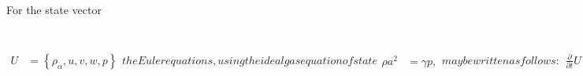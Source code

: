 For the state vector
\begin{subequations}
\label{eq:eulerprim}
\begin{align}
  U &= \left\{ \rho_\alpha, u, v, w, p \right\}
\end{align}
the Euler equations, using the ideal gas equation of state
\begin{align}
  \rho a^2 &= \gamma p,
\end{align}
may be written as follows:
\begin{align}
    \frac{\partial}{\partial{}t}U
+ A \frac{\partial}{\partial{}x}U
+ B \frac{\partial}{\partial{}y}U
+ C \frac{\partial}{\partial{}z}U
&= 0
\end{align}
\begin{align}
 A &= \begin{bmatrix}
        u & \rho_\alpha & 0 & 0 & 0              \\
        0 & u           & 0 & 0 & \frac{1}{\rho} \\
        0 & 0           & u & 0 & 0              \\
        0 & 0           & 0 & u & 0              \\
        0 & \gamma p    & 0 & 0 & u              \\
       \end{bmatrix}
&
 B &= \begin{bmatrix}
        v & 0 & \rho_\alpha & 0 & 0              \\
        0 & v & 0           & 0 & 0              \\
        0 & 0 & v           & 0 & \frac{1}{\rho} \\
        0 & 0 & 0           & v & 0              \\
        0 & 0 & \gamma p    & 0 & v              \\
       \end{bmatrix}
&
 C &= \begin{bmatrix}
        w & 0 & 0 & \rho_\alpha & 0              \\
        0 & w & 0 & 0           & 0              \\
        0 & 0 & w & 0           & 0              \\
        0 & 0 & 0 & w           & \frac{1}{\rho} \\
        0 & 0 & 0 & \gamma p    & w              \\
       \end{bmatrix}
\end{align}
\end{subequations}

